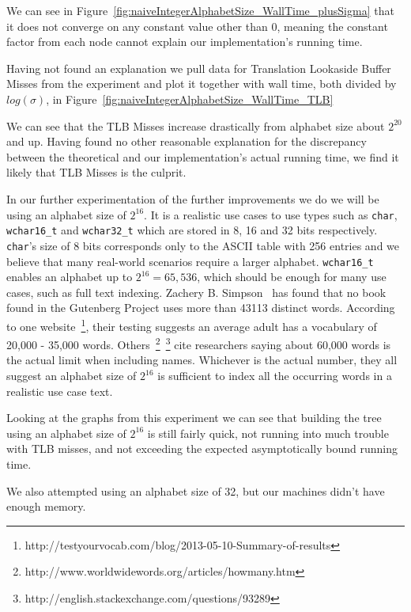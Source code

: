 We can see in Figure~\ref{fig:naiveIntegerAlphabetSize_WallTime_plusSigma} that it does not converge on any constant value other than 0, meaning the constant factor from each node cannot explain our implementation's running time.

Having not found an explanation we pull data for Translation Lookaside Buffer Misses from the experiment and plot it together with wall time, both divided by $log(\sigma)$, in Figure~\ref{fig:naiveIntegerAlphabetSize_WallTime_TLB}




We can see that the TLB Misses increase drastically from alphabet size about $2^{20}$ and up.
Having found no other reasonable explanation for the discrepancy between the theoretical and our implementation's actual running time, we find it likely that TLB Misses is the culprit.

In our further experimentation of the further improvements we do we will be using an alphabet size of $2^{16}$.
It is a realistic use cases to use types such as \texttt{char}, \texttt{wchar16\_t} and \texttt{wchar32\_t} which are stored in 8, 16 and 32 bits respectively.
\texttt{char}'s size of 8 bits corresponds only to the ASCII table with 256 entries and we believe that many real-world scenarios require a larger alphabet.
\texttt{wchar16\_t} enables an alphabet up to $2^{16} = 65,536$, which should be enough for many use cases, such as full text indexing.
Zachery B. Simpson~\citep{bookWordStatistics} has found that no book found in the Gutenberg Project uses more than 43113 distinct words.
According to one website~\footnote{http://testyourvocab.com/blog/2013-05-10-Summary-of-results}, their testing suggests an average adult has a vocabulary of 20,000 - 35,000 words. 
Others~\footnote{http://www.worldwidewords.org/articles/howmany.htm}~\footnote{http://english.stackexchange.com/questions/93289} cite researchers saying about 60,000 words is the actual limit when including names.
Whichever is the actual number, they all suggest an alphabet size of $2^{16}$ is sufficient to index all the occurring words in a realistic use case text.

Looking at the graphs from this experiment we can see that building the tree using an alphabet size of $2^{16}$ is still fairly quick, not running into much trouble with TLB misses, and not exceeding the expected asymptotically bound running time.

We also attempted using an alphabet size of 32, but our machines didn't have enough memory.


